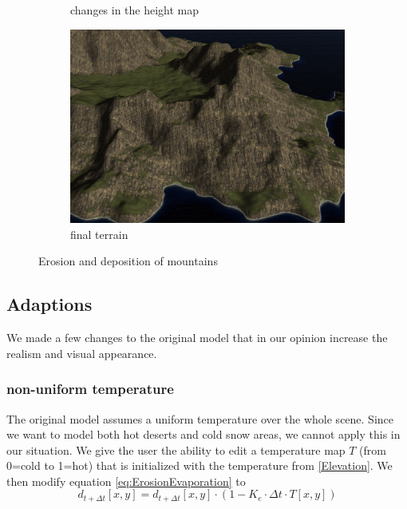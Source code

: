 \documentclass[journal, letterpaper]{IEEEtran}
\begin{document}
\begin{figure}
\begin{subfigure}[b]{0.45\textwidth}
		\caption{changes in the height map}
		\label{fig:erosion3}
	\end{subfigure}
	\begin{subfigure}[b]{0.45\textwidth}
		\includegraphics[width=\textwidth]{images/Erosion4}
		\caption{final terrain}
		\label{fig:erosion4}
	\end{subfigure}
	\caption{Erosion and deposition of mountains}\label{fig:erosion}
\end{figure}

\subsection{Adaptions}
We made a few changes to the original model that in our opinion increase the realism and visual appearance.

\subsubsection{non-uniform temperature}
The original model assumes a uniform temperature over the whole scene. Since we want to model both hot deserts and cold snow areas, we cannot apply this in our situation. 
We give the user the ability to edit a temperature map $T$ (from 0=cold to 1=hot) that is initialized with the temperature from \ref{Elevation}.
We then modify equation \ref{eq:ErosionEvaporation} to 
\begin{equation}
	d_{t+\Delta t}[x,y] = d_{t+\Delta t}[x,y] \cdot (1-K_e \cdot \Delta t \cdot T[x,y])
\label{eq:ErosionEvaporationExt}
\end{equation}
\end{document}
